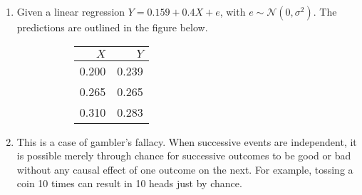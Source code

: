 \begin{enumerate}
\begin{enumerate}
\begin{figure}[H]
	\end{figure}

\end{enumerate}

\item Given a linear regression $ Y = 0.159 + 0.4X + e $, with $ e \sim \mathcal{N}(0, \sigma^2) $. The predictions are outlined in the figure below.\\

\begin{figure}[H]
	\begin{subfigure}[]{0.2\linewidth}
		\centering
		\begin{tabular}{@{}rr@{}}
			\toprule
			$X$     &    $ Y $ \\
			\midrule
			  0.200  &  0.239    \\
			 0.265	&  0.265   \\
			  0.310  &  0.283  \\
			\bottomrule
		\end{tabular}
		
	\end{subfigure}
	\begin{subfigure}[]{0.8\linewidth}
		\centering
		
	\end{subfigure}
\end{figure}

\item This is a case of gambler's fallacy. When successive events are independent, it is possible merely through chance for successive outcomes to be good or bad without any causal effect of one outcome on the next. For example, tossing a coin 10 times can result in 10 heads just by chance.\\


\end{enumerate}
